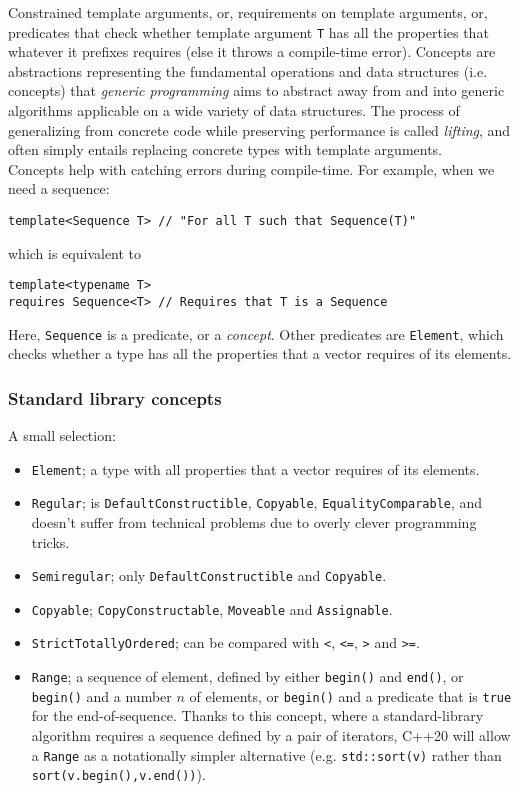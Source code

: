 \documentclass[8pt, table, xcdraw]{article}%
\begin{document}
Constrained template arguments, or, requirements on template arguments, or, predicates that check whether template argument \lstinline{T} has all the properties that whatever it prefixes requires (else it throws a compile-time error). Concepts are abstractions representing the fundamental operations and data structures (i.e. concepts) that \emph{generic programming} aims to abstract away from and into generic algorithms applicable on a wide variety of data structures. The process of generalizing from concrete code while preserving performance is called \emph{lifting}, and often simply entails replacing concrete types with template arguments.\\
Concepts help with catching errors during compile-time. For example, when we need a sequence:

\begin{lstlisting}
template<Sequence T> // "For all T such that Sequence(T)"
\end{lstlisting}

which is equivalent to

\begin{lstlisting}
template<typename T>
requires Sequence<T> // Requires that T is a Sequence
\end{lstlisting}

Here, \lstinline{Sequence} is a predicate, or a \emph{concept}. Other predicates are \lstinline{Element}, which checks whether a type has all the properties that a vector requires of its elements.

\subsubsection{Standard library concepts}

A small selection:
\begin{itemize}
    \item \lstinline{Element}; a type with all properties that a vector requires of its elements.
    \item \lstinline{Regular}; is \lstinline{DefaultConstructible}, \lstinline{Copyable}, \lstinline{EqualityComparable}, and doesn't suffer from technical problems due to overly clever programming tricks.
    \item \lstinline{Semiregular}; only \lstinline{DefaultConstructible} and \lstinline{Copyable}.
    \item \lstinline{Copyable}; \lstinline{CopyConstructable}, \lstinline{Moveable} and \lstinline{Assignable}.
    \item \lstinline{StrictTotallyOrdered}; can be compared with \lstinline{<}, \lstinline{<=}, \lstinline{>} and \lstinline{>=}.
    \item \lstinline{Range}; a sequence of element, defined by either \lstinline{begin()} and \lstinline{end()}, or \lstinline{begin()} and a number $n$ of elements, or \lstinline{begin()} and a predicate that is \lstinline{true} for the end-of-sequence. Thanks to this concept, where a standard-library algorithm requires a sequence defined by a pair of iterators, C++20 will allow a \lstinline{Range} as a notationally simpler alternative (e.g. \lstinline{std::sort(v)} rather than \lstinline{sort(v.begin(),v.end())}). 
\end{itemize}
\end{document}
